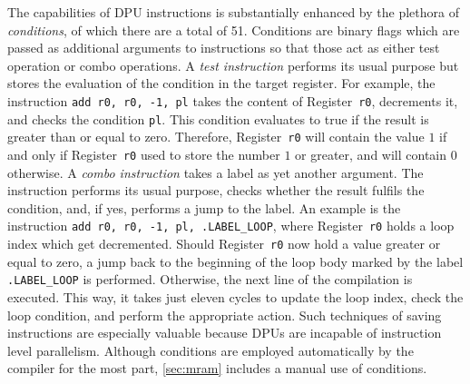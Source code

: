 The capabilities of \ac{DPU} instructions is substantially enhanced by the plethora of \emph{conditions}, of which there are a total of 51.
Conditions are binary flags which are passed as additional arguments to instructions so that those act as either test operation or combo operations.
A \emph{test instruction} performs its usual purpose but stores the evaluation of the condition in the target register.
For example, the instruction \lstinline|add r0, r0, -1, pl| takes the content of Register~\lstinline|r0|, decrements it, and checks the condition \lstinline|pl|.
This condition evaluates to true if the result is greater than or equal to zero.
Therefore, Register~\lstinline|r0| will contain the value \(1\) if and only if Register~\lstinline|r0| used to store the number \(1\) or greater, and will contain \(0\) otherwise.
A \emph{combo instruction} takes a label as yet another argument.
The instruction performs its usual purpose, checks whether the result fulfils the condition, and, if yes, performs a jump to the label.
An example is the instruction \lstinline|add r0, r0, -1, pl, .LABEL_LOOP|, where Register~\lstinline|r0| holds a loop index which get decremented.
Should Register~\lstinline|r0| now hold a value greater or equal to zero, a jump back to the beginning of the loop body marked by the label \lstinline|.LABEL_LOOP| is performed.
Otherwise, the next line of the compilation is executed.
This way, it takes just eleven cycles to update the loop index, check the loop condition, and perform the appropriate action.
Such techniques of saving instructions are especially valuable because \acp{DPU} are incapable of instruction level parallelism.
Although conditions are employed automatically by the compiler for the most part, \cref{sec:mram} includes a manual use of conditions.
